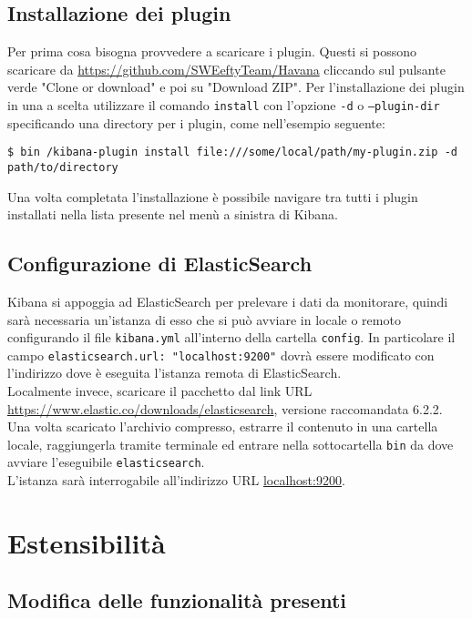 \subsection{Installazione dei plugin}
Per prima cosa bisogna provvedere a scaricare i plugin. Questi si possono scaricare da \href{https://github.com/SWEeftyTeam/Havana}{https://github.com/SWEeftyTeam/Havana} cliccando sul pulsante verde "Clone or download" e poi su "Download ZIP".
Per l'installazione dei plugin in una  a scelta utilizzare il comando \texttt{install} con l'opzione \texttt{-d} o \texttt{--plugin-dir}  specificando una directory per i plugin, come nell'esempio seguente:
\begin{lstlisting}
$ bin /kibana-plugin install file:///some/local/path/my-plugin.zip -d path/to/directory 
\end{lstlisting}
Una volta completata l'installazione è possibile navigare tra tutti i plugin installati nella lista presente nel menù a sinistra di Kibana.
\subsection{Configurazione di ElasticSearch}
Kibana si appoggia ad ElasticSearch per prelevare i dati da monitorare, quindi sarà necessaria un'istanza di esso che si può avviare in locale o remoto configurando il file \texttt{kibana.yml} all'interno della cartella \texttt{config}. In particolare il campo \texttt{elasticsearch.url: "localhost:9200"} dovrà essere modificato con l'indirizzo dove è eseguita l'istanza remota di ElasticSearch.\\
Localmente invece, scaricare il pacchetto dal link URL \url{https://www.elastic.co/downloads/elasticsearch}, versione raccomandata 6.2.2.
Una volta scaricato l'archivio compresso, estrarre il contenuto in una cartella locale, raggiungerla tramite terminale ed entrare nella sottocartella \texttt{bin} da dove avviare l'eseguibile \texttt{elasticsearch}.\\
L'istanza sarà interrogabile all'indirizzo URL \url{localhost:9200}.
\newpage
\section{Estensibilità}
\subsection{Modifica delle funzionalità presenti}
